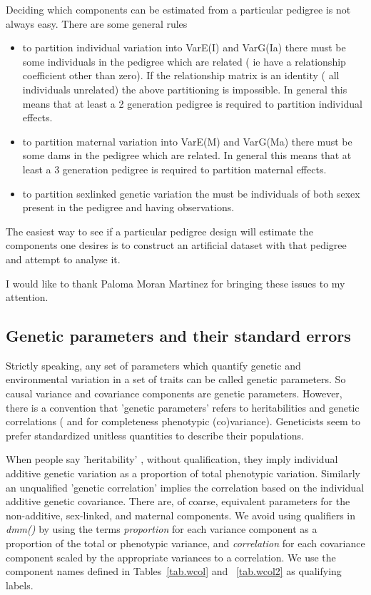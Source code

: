 \documentclass[titlepage]{article}  %
\begin{document}
Deciding which components can be estimated from a particular pedigree is not always easy. There are some general rules
\begin{itemize}
\item to partition individual variation into VarE(I) and VarG(Ia) there must be some individuals in the pedigree which are related ( ie have a relationship coefficient other than zero). If the relationship matrix is an identity ( all individuals unrelated) the above partitioning is impossible. In general this means that at least a 2 generation pedigree is required to partition individual effects.
\item to partition maternal variation into VarE(M) and VarG(Ma) there must be some dams in the pedigree which are related. In general this means that at least a 3 generation pedigree is required to partition maternal effects.
\item to partition sexlinked genetic variation the must be individuals of both sexex present in the pedigree and having observations.
\end{itemize}

The easiest way to see if a particular pedigree design will estimate the components one desires is to construct an artificial dataset with that pedigree and attempt to analyse it.

I would like to thank Paloma Moran Martinez for bringing these issues to my attention.

\clearpage
\subsection{Genetic parameters and their standard errors}
Strictly speaking, any set of parameters which quantify genetic and environmental variation in a set of traits can be called genetic parameters. So causal variance and covariance components are genetic parameters. However, there is a convention that 'genetic parameters' refers to heritabilities and genetic correlations ( and for completeness phenotypic (co)variance). Geneticists seem to prefer standardized unitless quantities to describe their populations.
 
 When people say 'heritability' , without qualification, they imply individual additive genetic variation as a proportion of total phenotypic variation. Similarly an unqualified 'genetic correlation' implies the correlation based on the individual additive genetic covariance. There are, of coarse, equivalent parameters for the non-additive, sex-linked, and maternal components. We avoid using qualifiers in {\em dmm()} by using the terms {\em proportion} for each variance component as a proportion of the total or phenotypic variance, and {\em correlation} for each covariance component scaled by the appropriate variances to a correlation. We use the component names defined in Tables~\ref{tab.wcol} and ~\ref{tab.wcol2} as qualifying labels.
\end{document}
